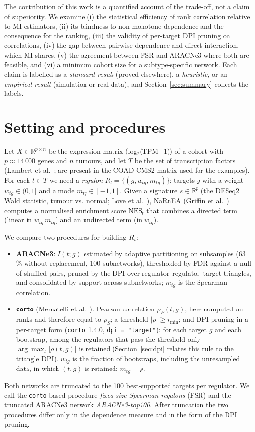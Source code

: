 \documentclass[11pt,a4paper]{article}
\theoremstyle{plain}
\theoremstyle{remark}
\newcommand{\MI}{I}
\newcommand{\rhoS}{\rho_{S}}
\newcommand{\rhoP}{\rho_{P}}
\newcommand{\FSR}{FSR}
\begin{document}
The contribution of this work is a quantified account of the trade-off, not a claim of superiority. We examine
(i) the statistical efficiency of rank correlation relative to MI estimators, (ii) its blindness to non-monotone
dependence and the consequence for the ranking, (iii) the validity of per-target DPI pruning on correlations,
(iv) the gap between pairwise dependence and direct interaction, which MI shares, (v) the agreement between \FSR{} and
ARACNe3 where both are feasible, and (vi) a minimum cohort size for a subtype-specific network. Each claim is labelled
as a \emph{standard result} (proved elsewhere), a \emph{heuristic}, or an \emph{empirical result} (simulation or real data), and
Section~\ref{sec:summary} collects the labels.

\section{Setting and procedures}
\label{sec:setting}

Let $X\in\mathbb{R}^{p\times n}$ be the expression matrix (log$_2$(TPM+1)) of a cohort with
$p\approx 14\,000$ genes and $n$ tumours, and let $T$ be the set of transcription factors
(Lambert et al.~\cite{lambert2018}; \ATworealntfsinmatrix{} are present in the COAD CMS2 matrix used for
the examples). For each $t\in T$ we need a \emph{regulon} $R_t=\{(g, w_{tg}, m_{tg})\}$:
targets $g$ with a weight $w_{tg}\in(0,1]$ and a mode $m_{tg}\in[-1,1]$. Given a signature
$s\in\mathbb{R}^p$ (the DESeq2 Wald statistic, tumour vs.\ normal; Love et al.~\cite{love2014}), NaRnEA
(Griffin et al.~\cite{griffin2023}) computes a normalised enrichment score $\mathrm{NES}_t$ that combines a directed
term (linear in $w_{tg}\,m_{tg}$) and an undirected term (in $w_{tg}$).


We compare two procedures for building $R_t$:
\begin{itemize}
  \item \textbf{ARACNe3}: $\MI(t;g)$ estimated by adaptive partitioning on subsamples (63\,\%
  without replacement, 100 subnetworks), thresholded by FDR against a null of shuffled pairs,
  pruned by the DPI over regulator--regulator--target triangles, and consolidated by support
  across subnetworks; $m_{tg}$ is the Spearman correlation.
  \item \textbf{\texttt{corto}} (Mercatelli et al.~\cite{mercatelli2020}): Pearson correlation $\rhoP(t,g)$,
  here computed on ranks and therefore equal to $\rhoS$; a threshold $|\rho|\ge r_{\min}$; and
  DPI pruning in a per-target form (\texttt{corto}~1.4.0, \texttt{dpi = "target"}): for each target $g$ and each bootstrap, among the
  regulators that pass the threshold only $\arg\max_t |\rho(t,g)|$ is retained
  (Section~\ref{sec:dpi} relates this rule to the triangle DPI). $w_{tg}$ is the fraction of
  bootstraps, including the unresampled data, in which $(t,g)$ is retained; $m_{tg}=\rho$.
\end{itemize}
Both networks are truncated to the 100 best-supported targets per regulator. We call the
\texttt{corto}-based procedure \emph{fixed-size Spearman regulons} (\FSR) and the truncated
ARACNe3 network \emph{ARACNe3-top100}. After truncation the two procedures differ only in the
dependence measure and in the form of the DPI pruning.
\end{document}
